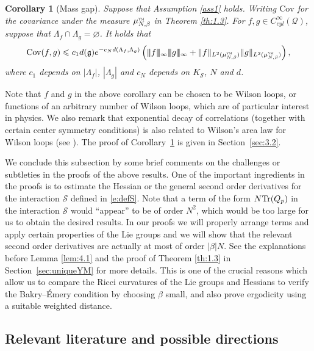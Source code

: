 \documentclass[11pt,UTF-8,reqno]{amsart}
\numberwithin{equation}{section}
\newtheorem{corollary}[theorem]{Corollary}
\def\${|\!|\!|}
\def\cov{{\mathrm{Cov}}}
\def\tr{\mathrm {tr}}
\def\cQ{{\mathcal Q}}
\def\cS{{\mathcal S}}
\def\leq{\leqslant}
\let\emptyset\varnothing
\def\tr{\mathrm {tr}}
\def\tr{{\rm Tr}}
\def\bc{\begin{corollary}}
\def\ec{\end{corollary}}
\def\mfg{\mathfrak{g}}
\def\leq{\leqslant}
\def\YM{\textnormal{\tiny \textsc{ym}}}
\def\muYM{\mu^{\YM}_{N,\beta}}
\def\dg{d(\mfg)}
\begin{document}
\bc[Mass gap]
\label{co:zmm} Suppose that Assumption \ref{ass1} holds. Writing $\cov$ for the covariance under the measure $\muYM$ in Theorem \ref{th:1.3}. For $f, g\in C^\infty_{cyl}(\cQ)$, suppose that $\Lambda_f\cap \Lambda_g=\emptyset$. It holds that
\begin{align*}
	\cov(f,g)\leq c_{1} \dg e^{-c_N d(\Lambda_f,\Lambda_g)} \left(\$ f \$_{\infty}\$ g \$_{\infty}+\|f\|_{L^2(\muYM)}\|g\|_{L^2(\muYM)}\right),
\end{align*}
where $c_{1}$ depends on $|\Lambda_f|$, $|\Lambda_g|$ and $c_N$ depends  on $K_\cS$,  $N$ and $d$.
\ec

Note that $f$ and $g$ in the above corollary can be chosen to be Wilson loops, or functions of an arbitrary number of Wilson loops,
which are of particular interest in physics.
We also remark that exponential decay of correlations (together with certain center symmetry conditions)
is also related to Wilson's area law for Wilson loops (see \cite[Theorem~2.4]{MR4278289}).
The proof of Corollary~\ref{co:zmm} is given in Section~\ref{sec:3.2}.



\medskip

We conclude this subsection
by some brief comments on the challenges or subtleties 
in the proofs of the above results.
One of the important ingredients 
in the proofs 
is to estimate  the Hessian or the general second order derivatives for the interaction $\cS$ defined in \eqref{e:defS}.
Note that a term of the form $N\tr(Q_p)$  in the interaction $\cS$ 
would ``appear'' to be of order $N^2$,
which would be too large for us to obtain the desired results.
In our proofs we will properly arrange terms and apply certain properties of the Lie groups and we will show that the relevant second order derivatives are actually at most of order $|\beta|N$. 
See the explanations before Lemma \ref{lem:4.1} and the proof of Theorem \ref{th:1.3} in Section~\ref{sec:uniqueYM} for more details. 
This is one of the crucial reasons which allow us to 
compare the
Ricci curvatures of the Lie groups and Hessians 
to verify the  Bakry--\'Emery condition
by choosing $\beta$ small, and also prove ergodicity 
using a suitable weighted distance.



\subsection{Relevant literature and possible directions}\label{sec:prev}
\end{document}
